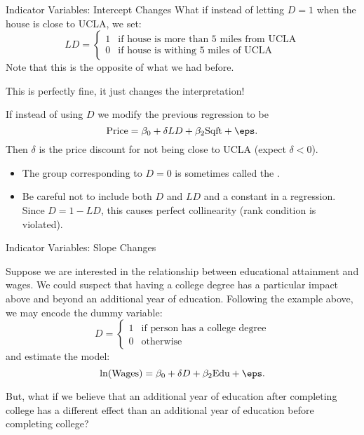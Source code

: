 \documentclass[notheorems, 9pt]{beamer}
\begin{document}
\begin{frame}{Indicator Variables: Intercept Changes} %
	 What if instead of letting \(D=1\) when the house is close to UCLA, we set:
	 \[
	    LD = \begin{cases}
	    	1 & \text{if house is more than 5 miles from UCLA} \\
			0 & \text{if house is withing 5 miles of UCLA}
	    \end{cases}
	\] 
	Note that this is the opposite of what we had before.
	
	 This is perfectly fine, it just changes the interpretation!
	\onslide<2->
	\begin{example*}
		If instead of using \(D\) we modify the previous regression to be
		\[
			\text{Price} = \beta_0 + \delta LD + \beta_2\text{Sqft} + \eps
		.\] 
		Then \(\delta\) is the price discount for not being close to UCLA (expect \(\delta < 0\)).
	\end{example*}
	
	\begin{itemize}
		\item The group corresponding to \(D=0\) is sometimes called the . 
		\item Be careful not to include both \(D\) and  \(LD\) and a constant in a regression. Since  \(D = 1 - LD\), this causes perfect collinearity (rank condition is violated).
	\end{itemize}
\end{frame}
\begin{frame}{Indicator Variables: Slope Changes} %
	\label{frame:slope-changes} %
	\begin{example*}
		Suppose we are interested in the relationship between educational attainment and wages. We could suspect that having a college degree has a particular impact above and beyond an additional year of education. Following the example above, we may encode the dummy variable:
		\[
		    D = \begin{cases}
		    	1 & \text{if person has a college degree} \\
				0 & \text{otherwise}
		    \end{cases}
		\] 
		and estimate the model:
		\[
			\ln(\text{Wages}) = \beta_0 + \delta D + \beta_2\text{Edu} + \eps
		.\] 
	\end{example*}
	 But, what if we believe that an additional year of education after completing college has a different effect than an additional year of education before completing college?
\end{frame}
\end{document}
